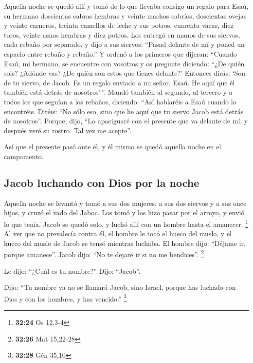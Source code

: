  Aquella noche se quedó allí y tomó de lo que llevaba
consigo un regalo para Esaú, su hermano  doscientas
cabras hembras y veinte machos cabríos, doscientas ovejas y veinte
carneros,  treinta camellos de leche y sus potros,
cuarenta vacas, diez toros, veinte asnos hembras y diez potros.
 Los entregó en manos de sus siervos, cada rebaño por
separado, y dijo a sus siervos: ``Pasad delante de mí y poned un espacio
entre rebaño y rebaño.''  Y ordenó a los primeros que
dijeran: ``Cuando Esaú, mi hermano, se encuentre con vosotros y os
pregunte diciendo: ``¿De quién sois? ¿Adónde vas? ¿De quién son estos
que tienes delante?'  Entonces dirás: `Son de tu siervo,
de Jacob. Es un regalo enviado a mi señor, Esaú. He aquí que él también
está detrás de nosotros'\,''.  Mandó también al segundo,
al tercero y a todos los que seguían a los rebaños, diciendo: ``Así
hablaréis a Esaú cuando lo encontréis.  Diréis: ``No sólo
eso, sino que he aquí que tu siervo Jacob está detrás de nosotros''.
Porque, dijo, ``Lo apaciguaré con el presente que va delante de mí, y
después veré su rostro. Tal vez me acepte''.

 Así que el presente pasó ante él, y él mismo se quedó
aquella noche en el campamento.

\hypertarget{jacob-luchando-con-dios-por-la-noche}{%
\subsection{Jacob luchando con Dios por la
noche}\label{jacob-luchando-con-dios-por-la-noche}}

 Aquella noche se levantó y tomó a sus dos mujeres, a sus
dos siervos y a sus once hijos, y cruzó el vado del Jaboc.
 Los tomó y los hizo pasar por el arroyo, y envió lo que
tenía.  Jacob se quedó solo, y luchó allí con un hombre
hasta el amanecer. \footnote{\textbf{32:24} Os 12,3-4} 
Al ver que no prevalecía contra él, el hombre le tocó el hueco del
muslo, y el hueco del muslo de Jacob se tensó mientras luchaba.
 El hombre dijo: ``Déjame ir, porque amanece''. Jacob
dijo: ``No te dejaré ir si no me bendices''. \footnote{\textbf{32:26}
  Mat 15,22-28}

 Le dijo: ``¿Cuál es tu nombre?'' Dijo: ``Jacob''.

 Dijo: ``Tu nombre ya no se llamará Jacob, sino Israel,
porque has luchado con Dios y con los hombres, y has vencido.''
\footnote{\textbf{32:28} Gén 35,10}


